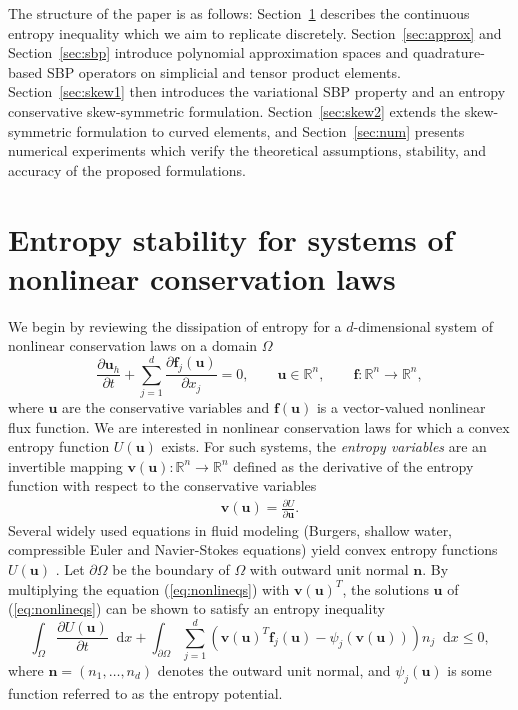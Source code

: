 \documentclass[review]{siamart0216}
\theoremstyle{assumption}
\newcommand{\pd}[2]{\frac{\partial#1}{\partial#2}}
\newcommand{\LRp}[1]{\left( #1 \right)}
\newcommand{\note}[1]{{\color{blue}{#1}}}
\newcommand*\diff[1]{\mathop{}\!{\mathrm{d}#1}}
\begin{document}
The structure of the paper is as follows: Section~\ref{sec:nonlin} describes the continuous entropy inequality which we aim to replicate discretely.  Section~\ref{sec:approx} and Section~\ref{sec:sbp} introduce polynomial approximation spaces and quadrature-based SBP operators on simplicial and tensor product elements.  Section~\ref{sec:skew1} then introduces the variational SBP property and an entropy conservative skew-symmetric formulation.  Section~\ref{sec:skew2} extends the skew-symmetric formulation to curved elements, and Section~\ref{sec:num} presents numerical experiments which verify the theoretical assumptions, stability, and accuracy of the proposed formulations.



\section{Entropy stability for systems of nonlinear conservation laws}
\label{sec:nonlin} 

We begin by reviewing the dissipation of entropy for a $d$-dimensional system of nonlinear conservation laws on a domain $\Omega$
\begin{equation}
\pd{\bm{u}_h}{t}  + \sum_{j=1}^d\pd{\bm{f}_j(\bm{u})}{x_j} = 0, \qquad \bm{u}\in \mathbb{R}^n, \qquad \bm{f}:\mathbb{R}^n\rightarrow\mathbb{R}^n,
\label{eq:nonlineqs}
\end{equation}
where $\bm{u}$ are the conservative variables and $\bm{f}(\bm{u})$ is a vector-valued nonlinear flux function.  We are interested in nonlinear conservation laws for which a convex entropy function $U(\bm{u})$ exists.  For such systems, the  \emph{entropy variables} are an invertible mapping $\bm{v}(\bm{u}):\mathbb{R}^n\rightarrow \mathbb{R}^n$ defined as the derivative of the entropy function with respect to the conservative variables 
\begin{align}
\bm{v}(\bm{u}) = \pd{U}{\bm{u}}.%
\label{eq:entropyvarsmap}
\end{align}
Several widely used equations in fluid modeling (Burgers, shallow water, compressible Euler and Navier-Stokes equations) yield convex entropy functions $U(\bm{u})$ \cite{hughes1986new, chen2017entropy}.  Let $\partial \Omega$ be the boundary of $\Omega$ with outward unit normal $\bm{n}$.  By multiplying the equation (\ref{eq:nonlineqs}) with $\bm{v}(\bm{u})^T$, the solutions $\bm{u}$ of (\ref{eq:nonlineqs}) can be shown to satisfy an entropy inequality
\begin{equation}
\int_{\Omega}\pd{U(\bm{u})}{t}\diff{x} + \int_{\partial \Omega} \sum_{j=1}^d \LRp{\bm{v}(\bm{u})^T\bm{f}_j(\bm{u}) - \psi_j\LRp{\bm{v}(\bm{u})}}n_j \diff{x} \leq 0, 
\label{eq:entropyineq}
\end{equation}
where $\bm{n} = \LRp{n_1,\ldots,n_d}$ denotes the outward unit normal, and $\psi_j(\bm{u})$ is some function referred to as the entropy potential.  
\end{document}
